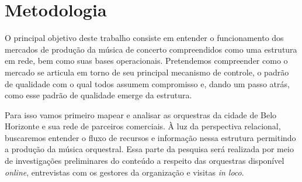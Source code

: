 \documentclass[a4paper, 12pt, openright, oneside, german, french, english, brazil]{abntex2}
\begin{document}
	
	\chapter{Metodologia}
	
	O principal objetivo deste trabalho consiste em entender o funcionamento dos mercados de produção da música de concerto compreendidos como uma estrutura em rede, bem como suas bases operacionais. Pretendemos compreender como o mercado se articula em torno de seu principal mecanismo de controle, o padrão de qualidade com o qual todos assumem compromisso e, dando um passo atrás, como esse padrão de qualidade emerge da estrutura. 
	
	Para isso vamos primeiro mapear e analisar as orquestras da cidade de Belo Horizonte e sua rede de parceiros comerciais. À luz da perspectiva relacional, buscaremos entender o fluxo de recursos e informação nessa estrutura permitindo a produção da música orquestral. Essa parte da pesquisa será realizada por meio de investigações preliminares do conteúdo a respeito das orquestras disponível \textit{online}, entrevistas com os gestores da organização e visitas \textit{in loco}.
	
\end{document}

